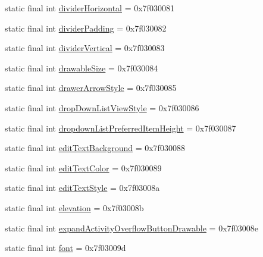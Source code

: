 \begin{DoxyCompactItemize}
\item 
static final int \mbox{\hyperlink{classandroid_1_1support_1_1v7_1_1appcompat_1_1R_1_1attr_a6f8ba93dda01b4ce5bf62f4e950a8700}{divider\+Horizontal}} = 0x7f030081
\item 
static final int \mbox{\hyperlink{classandroid_1_1support_1_1v7_1_1appcompat_1_1R_1_1attr_a68d39d7b28b9b24e4dd92b6e761413ee}{divider\+Padding}} = 0x7f030082
\item 
static final int \mbox{\hyperlink{classandroid_1_1support_1_1v7_1_1appcompat_1_1R_1_1attr_a7cc67a6baac85daf6ea6800596b701c9}{divider\+Vertical}} = 0x7f030083
\item 
static final int \mbox{\hyperlink{classandroid_1_1support_1_1v7_1_1appcompat_1_1R_1_1attr_ae9b180271adb30a594bdee8324935397}{drawable\+Size}} = 0x7f030084
\item 
static final int \mbox{\hyperlink{classandroid_1_1support_1_1v7_1_1appcompat_1_1R_1_1attr_ad95655c95f6510c592533a0b11794ca0}{drawer\+Arrow\+Style}} = 0x7f030085
\item 
static final int \mbox{\hyperlink{classandroid_1_1support_1_1v7_1_1appcompat_1_1R_1_1attr_a64e8f8d2fe3975f4412601919958a9b4}{drop\+Down\+List\+View\+Style}} = 0x7f030086
\item 
static final int \mbox{\hyperlink{classandroid_1_1support_1_1v7_1_1appcompat_1_1R_1_1attr_a5ec5e31cf78fb18fe640dde5168b1ae4}{dropdown\+List\+Preferred\+Item\+Height}} = 0x7f030087
\item 
static final int \mbox{\hyperlink{classandroid_1_1support_1_1v7_1_1appcompat_1_1R_1_1attr_a405d67c37734e38d5b68d3097f4e08e9}{edit\+Text\+Background}} = 0x7f030088
\item 
static final int \mbox{\hyperlink{classandroid_1_1support_1_1v7_1_1appcompat_1_1R_1_1attr_a3ef0f5f320b70fe255067409b7ef5a17}{edit\+Text\+Color}} = 0x7f030089
\item 
static final int \mbox{\hyperlink{classandroid_1_1support_1_1v7_1_1appcompat_1_1R_1_1attr_adb21f96a96e592e622d373cf62cb5b55}{edit\+Text\+Style}} = 0x7f03008a
\item 
static final int \mbox{\hyperlink{classandroid_1_1support_1_1v7_1_1appcompat_1_1R_1_1attr_a857db0711c5ee6c5f31d51c0e1dcf793}{elevation}} = 0x7f03008b
\item 
static final int \mbox{\hyperlink{classandroid_1_1support_1_1v7_1_1appcompat_1_1R_1_1attr_a08db43c910c44c3cd8ba06573e44e88b}{expand\+Activity\+Overflow\+Button\+Drawable}} = 0x7f03008e
\item 
static final int \mbox{\hyperlink{classandroid_1_1support_1_1v7_1_1appcompat_1_1R_1_1attr_ad7c911a2663c252f2d011c67d6d33f32}{font}} = 0x7f03009d

\end{DoxyCompactItemize}
